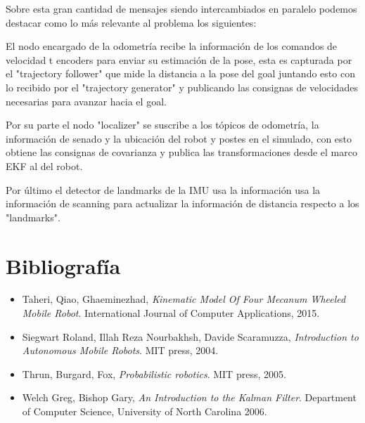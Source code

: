 Sobre esta gran cantidad de mensajes siendo intercambiados en paralelo podemos destacar como lo más relevante al problema los siguientes:

El nodo encargado de la odometría recibe la información de los comandos de velocidad t encoders para enviar su estimación de la pose, esta es capturada por el "trajectory follower" que mide la distancia a la pose del goal juntando esto con lo recibido por el "trajectory generator" y publicando las consignas de velocidades necesarias para avanzar hacia el goal.

Por su parte el nodo "localizer" se suscribe a los tópicos de odometría, la información de senado y la ubicación del robot y postes en el simulado, con esto obtiene las consignas de covarianza y publica las transformaciones desde el marco EKF al del robot.

Por último el detector de landmarks de la IMU usa la información usa la información de scanning para actualizar la información de distancia respecto a los "landmarks".

\pagebreak
\section{Bibliografía}



\begin{itemize}
\item{Taheri, Qiao, Ghaeminezhad},
\textit{Kinematic Model Of Four Mecanum Wheeled Mobile Robot}.
International Journal of Computer Applications, 2015.
\item{Siegwart Roland, Illah Reza Nourbakhsh, Davide Scaramuzza},
\textit{Introduction to Autonomous Mobile Robots}.
MIT press, 2004.
\item{Thrun, Burgard, Fox},
\textit{Probabilistic robotics}.
MIT press, 2005. 
\item{Welch Greg, Bishop Gary},
\textit{An Introduction to the Kalman Filter}.
Department of Computer Science, University of North Carolina 2006.
\end{itemize}